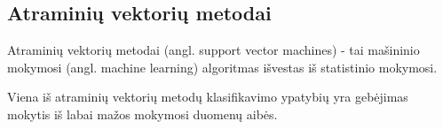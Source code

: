 \subsection{Atraminių vektorių metodai}

Atraminių vektorių metodai\cite{simkevicius06} (angl. support vector machines) -
tai mašininio mokymosi (angl. machine learning) algoritmas išvestas iš
statistinio mokymosi.



Viena iš atraminių vektorių metodų klasifikavimo ypatybių yra gebėjimas mokytis
iš labai mažos mokymosi duomenų aibės.
